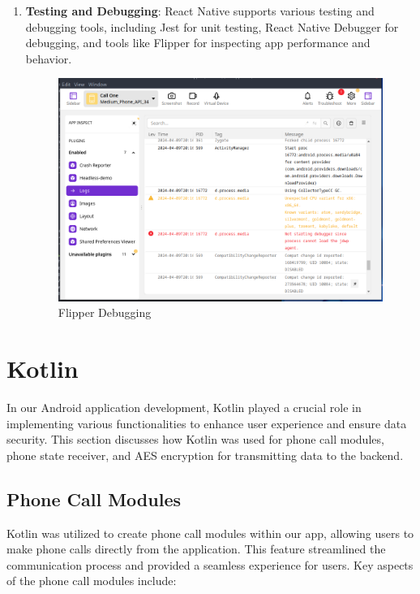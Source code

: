 \begin{enumerate}
  \item \textbf{Testing and Debugging}: React Native supports various testing and debugging tools, including Jest for unit testing, React Native Debugger for debugging, and tools like Flipper for inspecting app performance and behavior.

 
  \begin{figure}
    \centering
    \includegraphics[width=1\linewidth]{Media//Chapter 6/flipper.png}
    \caption{Flipper Debugging}
    \label{fig:Flipper Debugging}
  \end{figure}

  
\end{enumerate}


\section{Kotlin}

In our Android application development, Kotlin played a crucial role in implementing various functionalities to enhance user experience and ensure data security. This section discusses how Kotlin was used for phone call modules, phone state receiver, and AES encryption for transmitting data to the backend.

\subsection{Phone Call Modules}

Kotlin was utilized to create phone call modules within our app, allowing users to make phone calls directly from the application. This feature streamlined the communication process and provided a seamless experience for users. Key aspects of the phone call modules include:

